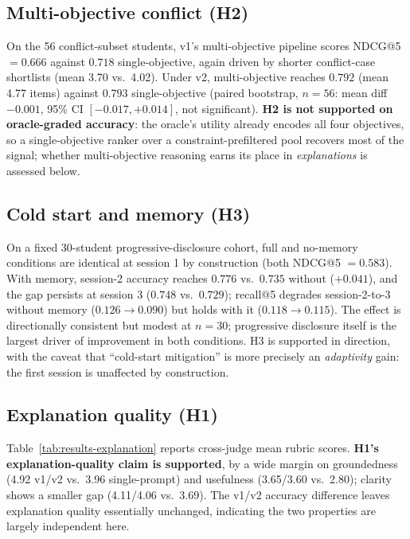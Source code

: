 \documentclass[conference]{IEEEtran}
\begin{document}
\subsection{Multi-objective conflict (H2)}

On the 56 conflict-subset students, v1's multi-objective pipeline scores NDCG@5 $=0.666$
against $0.718$ single-objective, again driven by shorter conflict-case shortlists (mean
3.70 vs.\ 4.02). Under v2, multi-objective reaches $0.792$ (mean 4.77 items) against
$0.793$ single-objective (paired bootstrap, $n=56$: mean diff $-0.001$, 95\% CI
$[-0.017,+0.014]$, not significant). \textbf{H2 is not supported on oracle-graded
accuracy}: the oracle's utility already encodes all four objectives, so a
single-objective ranker over a constraint-prefiltered pool recovers most of the signal;
whether multi-objective reasoning earns its place in \emph{explanations} is assessed below.

\subsection{Cold start and memory (H3)}

On a fixed 30-student progressive-disclosure cohort, full and no-memory conditions are
identical at session 1 by construction (both NDCG@5 $=0.583$). With memory, session-2
accuracy reaches $0.776$ vs.\ $0.735$ without ($+0.041$), and the gap persists at session 3
($0.748$ vs.\ $0.729$); recall@5 degrades session-2-to-3 without memory ($0.126\to0.090$)
but holds with it ($0.118\to0.115$). The effect is directionally consistent but modest at
$n=30$; progressive disclosure itself is the largest driver of improvement in both
conditions. H3 is supported in direction, with the caveat that ``cold-start mitigation'' is
more precisely an \emph{adaptivity} gain: the first session is unaffected by construction.

\subsection{Explanation quality (H1)}

Table~\ref{tab:results-explanation} reports cross-judge mean rubric scores. \textbf{H1's
explanation-quality claim is supported}, by a wide margin on groundedness (4.92 v1/v2 vs.\
3.96 single-prompt) and usefulness (3.65/3.60 vs.\ 2.80); clarity shows a smaller gap
(4.11/4.06 vs.\ 3.69). The v1/v2 accuracy difference leaves explanation quality essentially
unchanged, indicating the two properties are largely independent here.
\end{document}

